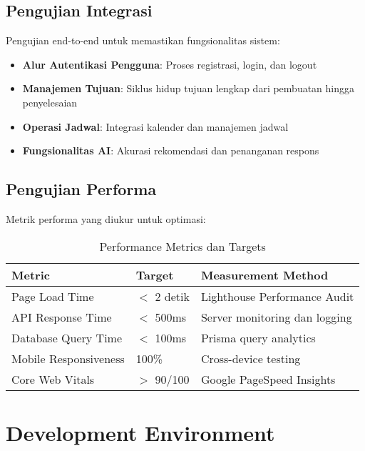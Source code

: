 \subsection{Pengujian Integrasi}

Pengujian end-to-end untuk memastikan fungsionalitas sistem:

\begin{itemize}
\item \textbf{Alur Autentikasi Pengguna}: Proses registrasi, login, dan logout
\item \textbf{Manajemen Tujuan}: Siklus hidup tujuan lengkap dari pembuatan hingga penyelesaian
\item \textbf{Operasi Jadwal}: Integrasi kalender dan manajemen jadwal
\item \textbf{Fungsionalitas AI}: Akurasi rekomendasi dan penanganan respons
\end{itemize}

\subsection{Pengujian Performa}

Metrik performa yang diukur untuk optimasi:

\begin{table}[ht]
\centering
\caption{Performance Metrics dan Targets}
\label{tab:performance-metrics}
\footnotesize
\begin{adjustbox}{width=\textwidth,center}
\begin{tabular}{@{}p{4cm}p{3cm}p{6cm}@{}}
\toprule
\textbf{Metric} & \textbf{Target} & \textbf{Measurement Method} \\
\midrule
Page Load Time & $<$ 2 detik & Lighthouse Performance Audit \\
\hline
API Response Time & $<$ 500ms & Server monitoring dan logging \\
\hline
Database Query Time & $<$ 100ms & Prisma query analytics \\
\hline
Mobile Responsiveness & 100\% & Cross-device testing \\
\hline
Core Web Vitals & $>$ 90/100 & Google PageSpeed Insights \\
\bottomrule
\end{tabular}
\end{adjustbox}
\end{table}

\section{Development Environment}

